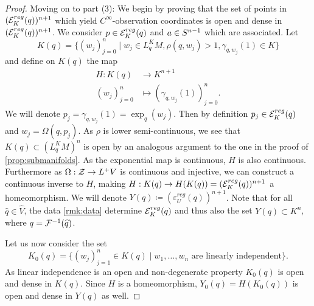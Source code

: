 \begin{proof}
    Moving on to part (3): We begin by proving that the set of points in $({{\mathcal{E}}^{reg}_K}(q))^{n+1}$ which yield $C^\infty$-observation coordinates is open and dense in $({{\mathcal{E}}^{reg}_K}(q))^{n+1}$.
    We consider $p\in {{\mathcal{E}}^{reg}_K}(q)$ and $a\in {S^{n-1}}$ which are associated. 
    Let 
    \[
        K(q) = \{(w_j)^n_{j=0} \mid w_j\in L^K_qM, \rho(q,w_j) > 1, \gamma_{q,w_j}(1)\in K\}
    \]
    and define on $K(q)$ the map
    \begin{align*}
        H:K(q)&\to K^{n+1}\\
        (w_j)^n_{j=0}&\mapsto (\gamma_{q,w_j}(1))^n_{j=0}.
    \end{align*}
    We will denote $p_j = \gamma_{q,w_j}(1) = \exp_q(w_j)$. Then by definition $p_j\in {{\mathcal{E}}^{reg}_K}(q)$ and $w_j = \Omega(q,p_j)$. As $\rho$ is lower semi-continuous, we see that $K(q)\subset (L_q^KM)^n$ is open by an analogous argument to the one in the proof of \ref{prop:submanifolds}. As the exponential map is continuous, $H$ is also continuous. Furthermore as $\Omega:{\mathcal{Z}}\to L^+V$ is continuous and injective, we can construct a continuous inverse to $H$, making $H:K(q) \to H(K(q)) = ({{\mathcal{E}}^{reg}_K}(q))^{n+1}$ a homeomorphism.
    We will denote $Y(q)\coloneqq(\varepsilon_U^{reg}(q))^{n+1}$.
    Note that for all $\widehat{q}\in \widehat{V}$, the data \ref{rmk:data} determine ${{\mathcal{E}}^{reg}_K}(q)$ and thus also the set $Y(q)\subset K^n$, where $q=\mathcal{F}^{-1}(\widehat{q})$.
    
    Let us now consider the set 
    \[
        K_0(q) = \{(w_j)_{j=1}^n\in K(q) \mid w_1,\dots,w_n \text{ are linearly independent}\}.
    \]
    As linear independence is an open and non-degenerate property $K_0(q)$ is open and dense in $K(q)$. Since $H$ is a homeomorphism, $Y_0(q) = H(K_0(q))$ is open and dense in $Y(q)$ as well.
    

\end{proof}
